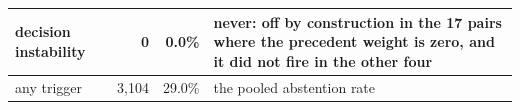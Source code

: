 \begin{tabular}{lrrp{}}
decision instability & 0 & 0.0\% & never: off by construction in the 17 pairs where the precedent weight is zero, and it did not fire in the other four \\
\midrule
any trigger & 3,104 & 29.0\% & the pooled abstention rate \\
\bottomrule
\end{tabular}
